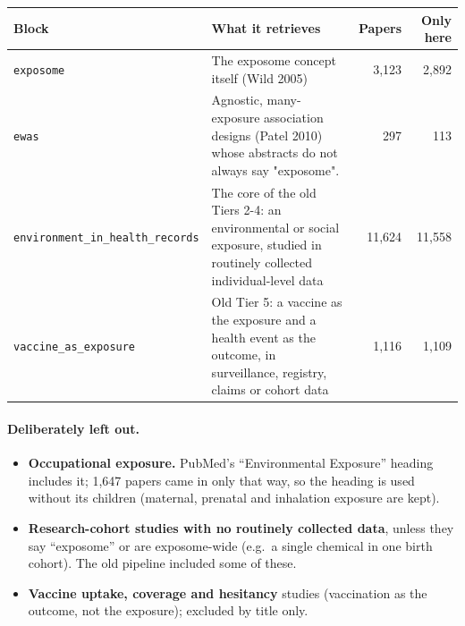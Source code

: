 \documentclass[10pt]{article}
\begin{document}
\begin{center}\begin{tabular}{@{}lP{8.6cm}rr@{}}\toprule
Block & What it retrieves & Papers & Only here\\\midrule
\texttt{exposome} & The exposome concept itself (Wild 2005) & 3,123 & 2,892\\
\texttt{ewas} & Agnostic, many-exposure association designs (Patel 2010) whose abstracts do not always say "exposome". & 297 & 113\\
\texttt{environment\_in\_health\_records} & The core of the old Tiers 2-4: an environmental or social exposure, studied in routinely collected individual-level data & 11,624 & 11,558\\
\texttt{vaccine\_as\_exposure} & Old Tier 5: a vaccine as the exposure and a health event as the outcome, in surveillance, registry, claims or cohort data & 1,116 & 1,109\\
\bottomrule\end{tabular}\end{center}

\paragraph{Deliberately left out.}
\begin{itemize}
\item \textbf{Occupational exposure.} PubMed's ``Environmental Exposure'' heading includes it; 1,647 papers came in
only that way, so the heading is used without its children (maternal, prenatal and inhalation exposure are kept).
\item \textbf{Research-cohort studies with no routinely collected data}, unless they say ``exposome'' or are
exposome-wide (e.g.\ a single chemical in one birth cohort). The old pipeline included some of these.
\item \textbf{Vaccine uptake, coverage and hesitancy} studies (vaccination as the outcome, not the exposure);
excluded by title only.
\end{itemize}
\end{document}
